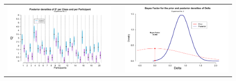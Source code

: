 \documentclass[final]{beamer}
\newlength{\sepwid}
\newlength{\onecolwid}
\newlength{\twocolwid}
\begin{document}
\begin{frame}[t]
\begin{columns}[t]
\begin{column}{\twocolwid}
\begin{columns}[t,totalwidth=\twocolwid]
\begin{column}{\onecolwid}
\begin{alertblock}{}
\begin{enumerate}
\begin{center}
\begin{tabular}{ccc}
\includegraphics[width=0.5\linewidth]{Figures/1-Exp2_1.pdf} & \hfill & \includegraphics[width=0.45\linewidth]{Figures/1-Exp2_2.pdf}
\end{tabular}
\end{center}


\end{enumerate}
\end{alertblock}
\end{column} %

\setlength{\onecolwid}{0.21\paperwidth}
\begin{column}{\sepwid}\end{column} %
\begin{column}{\onecolwid}\vspace{-.6in} %




\begin{alertblock}{}


\end{alertblock}
\end{column}
\end{columns}
\end{column}
\end{columns}
\end{frame}
\end{document}

